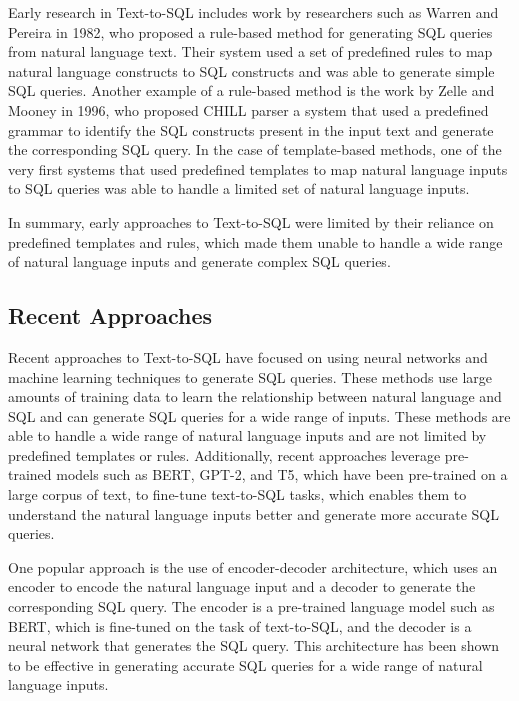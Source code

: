 Early research in Text-to-SQL includes work by researchers such as Warren and Pereira in 1982\cite{Warren1982AnEE}, who proposed a rule-based method for generating SQL queries from natural language text. Their system used a set of predefined rules to map natural language constructs to SQL constructs and was able to generate simple SQL queries.
Another example of a rule-based method is the work by Zelle and Mooney in 1996, who proposed CHILL parser\cite{Zelle1996LearningTP} a system that used a predefined grammar to identify the SQL constructs present in the input text and generate the corresponding SQL query.
In the case of template-based methods, one of the very first systems that used predefined templates to map natural language inputs to SQL queries was able to handle a limited set of natural language inputs.

In summary, early approaches to Text-to-SQL were limited by their reliance on predefined templates and rules, which made them unable to handle a wide range of natural language inputs and generate complex SQL queries.

\subsection{Recent Approaches}

Recent approaches to Text-to-SQL have focused on using neural networks and machine learning techniques to generate SQL queries. These methods use large amounts of training data to learn the relationship between natural language and SQL and can generate SQL queries for a wide range of inputs. These methods are able to handle a wide range of natural language inputs and are not limited by predefined templates or rules. Additionally, recent approaches leverage pre-trained models such as BERT, GPT-2, and T5, which have been pre-trained on a large corpus of text, to fine-tune text-to-SQL tasks, which enables them to understand the natural language inputs better and generate more accurate SQL queries.

One popular approach is the use of encoder-decoder architecture, which uses an encoder to encode the natural language input and a decoder to generate the corresponding SQL query. The encoder is a pre-trained language model such as BERT, which is fine-tuned on the task of text-to-SQL, and the decoder is a neural network that generates the SQL query. This architecture has been shown to be effective in generating accurate SQL queries for a wide range of natural language inputs.

